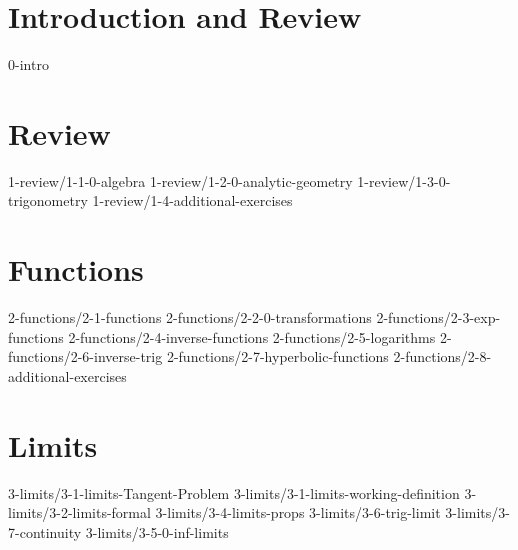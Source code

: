 \chapter*{Introduction and Review}
	{0-intro}

\chapter{Review}\label{chap:Review}
	{1-review/1-1-0-algebra}
	{1-review/1-2-0-analytic-geometry}
	{1-review/1-3-0-trigonometry}
	{1-review/1-4-additional-exercises}

\chapter{Functions}\label{chap:Functions}
	{2-functions/2-1-functions}
	{2-functions/2-2-0-transformations}
	{2-functions/2-3-exp-functions}
	{2-functions/2-4-inverse-functions}
	{2-functions/2-5-logarithms}
	{2-functions/2-6-inverse-trig}
	{2-functions/2-7-hyperbolic-functions}
	{2-functions/2-8-additional-exercises}

\chapter{Limits}\label{chap:Limits}
    {3-limits/3-1-limits-Tangent-Problem}
	{3-limits/3-1-limits-working-definition}
	{3-limits/3-2-limits-formal}
	{3-limits/3-4-limits-props}
	{3-limits/3-6-trig-limit}
	{3-limits/3-7-continuity}
	{3-limits/3-5-0-inf-limits}

